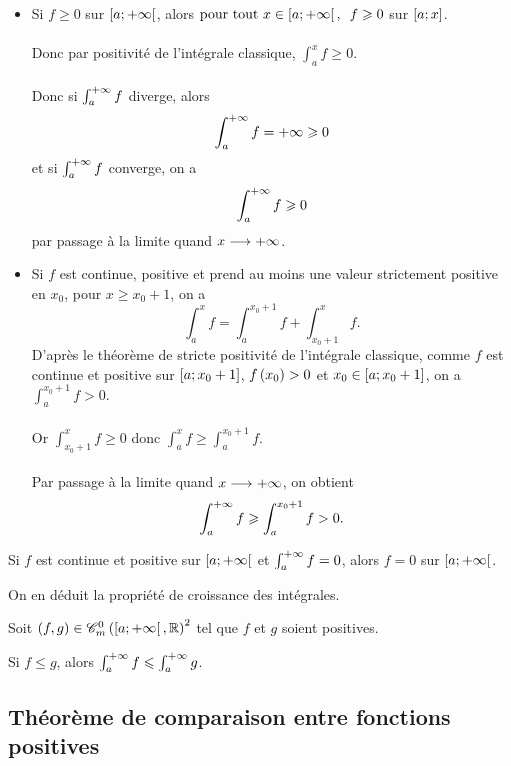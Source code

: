\begin{dem}
\begin{itemize}
    \item Si \(f\geq0\) sur \(\left[a;+\infty\right[\), alors \(\quantifs{\tpt x\in\intervie{a}{\pinf}}f\geq0\) sur \(\left[a;x\right]\). \\\\ Donc par positivité de l'intégrale classique, \(\int_a^xf\geq0\). \\\\ Donc si \(\int_a^{+\infty}f\) diverge, alors \[\int_a^{+\infty}f=+\infty\geqslant0\] et si \(\int_a^{+\infty}f\) converge, on a \[\int_a^{+\infty}f\geqslant0\] par passage à la limite quand \(x\longrightarrow+\infty\). \\
    \item Si \(f\) est continue, positive et prend au moins une valeur strictement positive en \(x_0\), pour \(x\geq x_0+1\), on a \[\int_a^xf=\int_a^{x_0+1}f+\int_{x_0+1}^xf.\] D'après le théorème de stricte positivité de l'intégrale classique, comme \(f\) est continue et positive sur \(\left[a;x_0+1\right]\), \(f\left(x_0\right)>0\) et \(x_0\in\left[a;x_0+1\right]\), on a \(\int_a^{x_0+1}f>0\). \\\\ Or \(\int_{x_0+1}^xf\geq0\) donc \(\int_a^xf\geq\int_a^{x_0+1}f\). \\\\ Par passage à la limite quand \(x\longrightarrow+\infty\), on obtient \[\int_a^{+\infty}f\geqslant\int_a^{x_0+1}f>0.\]
\end{itemize}
\end{dem}

\begin{rem}[Contraposée]
Si \(f\) est continue et positive sur \(\left[a;+\infty\right[\) et \(\int_a^{+\infty}f=0\), alors \(f=0\) sur \(\left[a;+\infty\right[\).
\end{rem}

On en déduit la propriété de croissance des intégrales.

\begin{prop}
Soit \(\paren{f,g}\in\contm[\intervie{a}{\pinf}][\R]^2\) tel que \(f\) et \(g\) soient positives.

Si \(f\leq g\), alors \(\int_a^{+\infty}f\leqslant\int_a^{+\infty}g\).
\end{prop}

\subsection{Théorème de comparaison entre fonctions positives}

